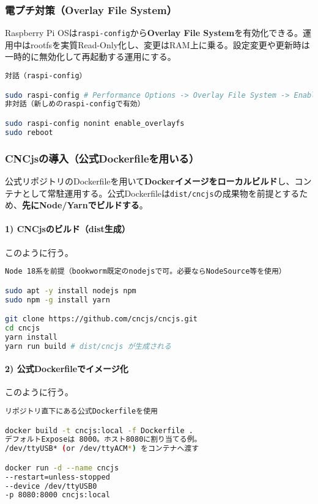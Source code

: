 \documentclass[uplatex,dvipdfmx]{ujarticle}
\begin{document}
\subsubsection*{電プチ対策（Overlay File System）}
Raspberry Pi OSは\texttt{raspi-config}から\textbf{Overlay File System}を有効化できる。運用中はrootfsを実質Read-Only化し、変更はRAM上に乗る。設定変更や更新時は一時的に無効化して再起動する運用にする。

\begin{lstlisting}[caption=OverlayFSの有効化（対話/非対話の例）, label=code:overlay, language=bash]
対話（raspi-config）

sudo raspi-config # Performance Options -> Overlay File System -> Enable
非対話（新しめのraspi-configで有効）

sudo raspi-config nonint enable_overlayfs
sudo reboot
\end{lstlisting}

\subsubsection*{CNCjsの導入（公式Dockerfileを用いる）}

公式リポジトリのDockerfileを用いて\textbf{Dockerイメージをローカルビルド}し、コンテナとして常駐運用する。公式Dockerfileは\texttt{dist/cncjs}の成果物を前提とするため、\textbf{先にNode/Yarnでビルドする}。

\paragraph{1) CNCjsのビルド（dist生成）} 
このように行う｡
\begin{lstlisting}[caption=Node/Yarnでフロントをビルド（Pi上で可）, label=code:build-dist, language=bash]
Node 18系を前提（bookworm既定のnodejsで可。必要ならNodeSource等を使用）

sudo apt -y install nodejs npm
sudo npm -g install yarn

git clone https://github.com/cncjs/cncjs.git
cd cncjs
yarn install
yarn run build # dist/cncjs が生成される
\end{lstlisting}
\newpage
\paragraph{2) 公式Dockerfileでイメージ化}
このように行う｡
\begin{lstlisting}[caption=Dockerビルドと起動, label=code:docker-run, language=bash]
リポジトリ直下にある公式Dockerfileを使用

docker build -t cncjs:local -f Dockerfile .
デフォルトExposeは 8000。ホスト8080に割り当てる例。
/dev/ttyUSB* (or /dev/ttyACM*) をコンテナへ渡す

docker run -d --name cncjs
--restart=unless-stopped
--device /dev/ttyUSB0
-p 8080:8000 cncjs:local
\end{lstlisting}
\end{document}
